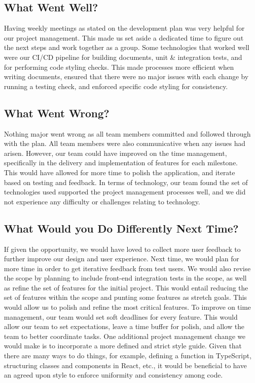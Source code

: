 \documentclass{article}
\begin{document}
\subsection{What Went Well?}
Having weekly meetings as stated on the development plan was very helpful for our project
management. This made us set aside a dedicated time to figure out the next steps and work together
as a group. Some technologies that worked well were our CI/CD pipeline for building documents, unit
& integration tests, and for performing code styling checks. This made processes more efficient
when writing documents, ensured that there were no major issues with each change by running a
testing check, and enforced specific code styling for consistency.

\subsection{What Went Wrong?}
Nothing major went wrong as all team members committed and followed through with the plan. All team
members were also communicative when any issues had arisen. However, our team could have improved
on the time management, specifically in the delivery and implementation of features for each
milestone. This would have allowed for more time to polish the application, and iterate based on
testing and feedback. In terms of technology, our team found the set of technologies used supported
the project management processes well, and we did not experience any difficulty or challenges
relating to technology.

\subsection{What Would you Do Differently Next Time?}
If given the opportunity, we would have loved to collect more user feedback to further improve our
design and user experience. Next time, we would plan for more time in order to get iterative
feedback from test users. We would also revise the scope by planning to include front-end
integration tests in the scope, as well as refine the set of features for the initial project. This
would entail reducing the set of features within the scope and punting some features as stretch
goals. This would allow us to polish and refine the most critical features. To improve on time
management, our team would set soft deadlines for every feature. This would allow our team to set
expectations, leave a time buffer for polish, and allow the team to better coordinate tasks. One
additional project management change we would make is to incorporate a more defined and strict
style guide. Given that there are many ways to do things, for example, defining a function in
TypeScript, structuring classes and components in React, etc., it would be beneficial to have an
agreed upon style to enforce uniformity and consistency among code.
\end{document}
